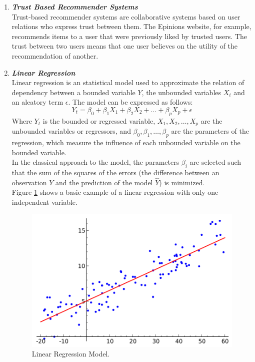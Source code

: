 \documentclass{article}
\begin{document}
\begin{enumerate}[label=(\alph*)]
\begin{enumerate}[label=\textbf{\arabic*.}]
            \item \textbf{\textit{Trust Based Recommender Systems}}\\
Trust-based recommender systems are collaborative systems based on user relations who express trust between them. The Epinions website, for example, recommends items to a user that were previously liked by trusted users. The trust between two users means that one user believes on the utility of the recommendation of another.
            
            \item \textbf{\textit{Linear Regression}}\\
Linear regression is an statistical model used to approximate the relation of dependency between a bounded variable $Y$, the unbounded variables $X_i$ and an aleatory term $\epsilon$. The model can be expressed as follows:
    \begin{equation*}
        Y_t = \beta_0 + \beta_1 X_1 + \beta_2 X_2 + \ldots + \beta_p X_p + \epsilon
    \end{equation*}
Where $Y_t$ is the bounded or regressed variable, $X_1, X_2, \ldots, X_p$ are the unbounded variables or regressors, and $\beta_0, \beta_1, \ldots, \beta_p$ are the parameters of the regression, which measure the influence of each unbounded variable on the bounded variable.\\
In the classical approach to the model, the parameters $\beta_i$ are selected such that the sum of the squares of the errors (the difference between an observation $Y$ and the prediction of the model $\hat{Y}$) is minimized.\\
Figure \ref{linear} shows a basic example of a linear regression with only one independent variable.
	\begin{figure}[ht]
		\centering
		\includegraphics[width=0.5\linewidth]{linear.png}
		\caption{Linear Regression Model.}
		\label{linear}
	\end{figure}
	

\end{enumerate}
\end{enumerate}
\end{document}
